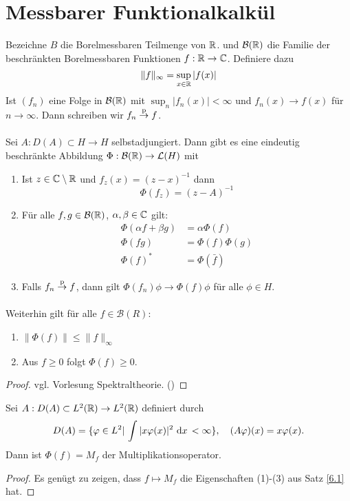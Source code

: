 \documentclass{mycourse}
\begin{document}
\section{Messbarer Funktionalkalkül}
Bezeichne $B$ die Borelmessbaren Teilmenge von $\mathbb{R}$. und $\mathcal B(\mathbb{R})$ die Familie der beschränkten Borelmessbaren Funktionen $f: \mathbb{R} \to \mathbb{C}$. Definiere dazu
\[
\| f\|_\infty = \sup_{x\in \mathbb{R}} |f(x)|
\]
Ist $(f_n)$ eine Folge in $\mathcal B(\mathbb{R})$ mit $\sup_{n} |f_n(x)| < \infty$ und $f_n(x) \to f(x)$ für $n\to \infty$. Dann schreiben wir $f_n \stack{\text{p}}\to f$.
\begin{st}\label{6.1}
Sei $A:D(A) \subset H \to H$ selbstadjungiert. Dann gibt es eine eindeutig beschränkte Abbildung $\Phi: \mathcal B(\mathbb{R}) \to \mathcal L(H)$ mit
\begin{enumerate}[(1)]
\item Ist $z\in \mathbb{C}\setminus\mathbb{R}$ und $f_z(x) = (z-x)^{-1}$ dann
\[
\Phi(f_z) =(z-A)^{-1}
\]
\item Für alle $f,g \in \mathcal B(\mathbb{R})$, $\alpha, \beta\in \mathbb{C}$ gilt:
\begin{align*}
\Phi(\alpha f + \beta g)&= \alpha \Phi(f)\\
\Phi(fg) &= \Phi(f) \Phi(g)\\
\Phi(f)^* &= \Phi(\bar f)
\end{align*}
\item Falls $f_n \stack{\text{p}}\to f$, dann gilt $\Phi(f_n) \phi \to \Phi(f) \phi$ für alle $\phi \in H$.
\end{enumerate}
Weiterhin gilt für alle $f\in \mathcal B(R)$:
\begin{enumerate}[(4)]
\item $\| \Phi(f)\| \le \|f\|_\infty$
\item Aus $f\ge 0$ folgt $\Phi(f) \ge 0$. 
\end{enumerate}
\end{st}
\begin{proof}
vgl. Vorlesung Spektraltheorie. ()
\end{proof}

\begin{ex*}
Sei $A: D(A) \subset L^2(\mathbb{R})\to L^2(\mathbb{R})$ definiert durch
\[
D(A) = \{\varphi \in L^2|\, \int |x\varphi(x)|^2 \, \,\mathrm{d}x\, <\infty\}, \quad (A\varphi) (x) = x \varphi(x).
\]
Dann ist $\Phi(f)=M_f$ der Multiplikationsoperator.
\end{ex*}
\begin{proof}
Es genügt zu zeigen, dass $f\mapsto M_f$ die Eigenschaften (1)-(3) aus Satz \ref{6.1} hat.
\end{proof}
\end{document}
